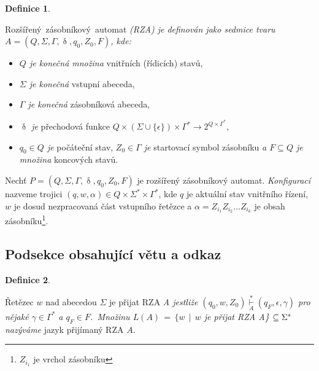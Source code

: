 \documentclass[11pt,a4paper,twocolumn]{article}
\theoremstyle{definition}
\newtheorem{definition}{Definice}
\begin{document}
\begin{definition}
\label{definition_rozsireny_zasobnikovy_automat}

    Rozšířený \,zásobníkový \,automat \emph{(RZA) je definován jako sedmice tvaru \(A = (Q, \Sigma, \Gamma, \updelta, q_0 , Z_0 , F)\), kde:}
    
\end{definition}

\renewcommand{\labelitemi}{$\bullet$}

\begin{itemize}

    \item \emph{\(Q\) je konečná množina} vnitřních (řídicích) stavů,

    \item \emph{\(\Sigma\) je konečná} vstupní abeceda,

    \item \emph{\(\Gamma\) je konečná} zásobníková abeceda,

    \item \emph{\(\updelta\) je} přechodová funkce \(Q \times (\Sigma \cup \{\epsilon\}) \times \Gamma ^* \to 2^{Q \times \Gamma ^*}\),

    \item \emph{\(q_0 \in Q\) je} počáteční stav, \emph{\(Z_0 \in \Gamma\) je} startovací symbol zásobníku \emph{a \(F \subseteq Q\) je množina} koncových stavů.

\end{itemize}

    Nechť \(P = (Q, \Sigma, \Gamma, \updelta, q_0 , Z_0 , F)\) je rozšířený zásobníkový automat. \emph{Konfigurací} nazveme trojici \emph{\((q, w, \alpha) \in Q \times \Sigma ^* \times \Gamma ^*\)}, kde \(q\) je aktuální stav vnitřního řízení, \(w\) je dosud nezpracovaná část vstupního řetězce a \(\alpha = Z_{i_1}Z_{i_2} \ldots Z_{i_k}\) je obsah zásobníku\footnote{\(Z_{i_1}\) je vrchol zásobníku}.

\subsection{Podsekce obsahující větu a odkaz}

\begin{definition}\label{retezec}

Řetězec \emph{\(w\)} nad abecedou \(\Sigma\) je přijat RZA \emph{A jestliže \((q_0, w, Z_0) \overset{*}{\underset{A}{\vdash}} (q_F,\epsilon, \gamma)\) pro nějaké \(\gamma \in \Gamma ^*\) a \(q_F \in F\). \,Množinu \(L(A) \,= \,\{w\:\:|\:\:w\) je přijat RZA A\} \(\subseteq \\\Sigma ^*\) nazýváme} jazyk přijímaný RZA \(A\).

\end{definition}
\end{document}
